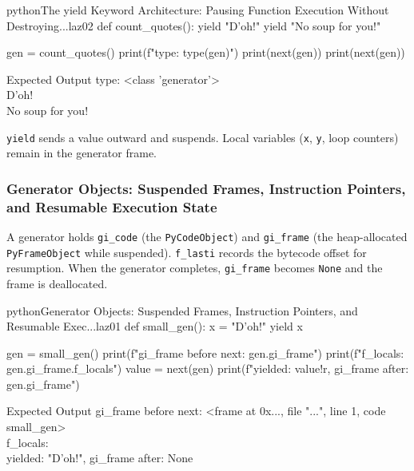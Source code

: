 \documentclass[a4paper,twoside]{report}
\begin{document}
\begin{codebox}[]{python}{The yield Keyword Architecture: Pausing Function Execution Without Destroying...}{laz02}
def count_quotes():
    yield "D'oh!"
    yield "No soup for you!"

gen = count_quotes()
print(f"type: {type(gen)}")
print(next(gen))
print(next(gen))
\end{codebox}


\begin{iobox}{Expected Output}
type: <class 'generator'> \\
D'oh! \\
No soup for you! \\
\end{iobox}




\texttt{yield} sends a value outward and suspends. Local variables (\texttt{x}, \texttt{y}, loop counters) remain in the generator frame.

\subsubsection{Generator Objects: Suspended Frames, Instruction Pointers, and Resumable Execution State}

A generator holds \texttt{gi\_code} (the \texttt{PyCodeObject}) and \texttt{gi\_frame} (the heap-allocated \texttt{PyFrameObject} while suspended). \texttt{f\_lasti} records the bytecode offset for resumption. When the generator completes, \texttt{gi\_frame} becomes \texttt{None} and the frame is deallocated.

\begin{codebox}[]{python}{Generator Objects: Suspended Frames, Instruction Pointers, and Resumable Exec...}{laz01}
def small_gen():
    x = "D'oh!"
    yield x

gen = small_gen()
print(f"gi_frame before next: {gen.gi_frame}")
print(f"f_locals: {gen.gi_frame.f_locals}")
value = next(gen)
print(f"yielded: {value!r}, gi_frame after: {gen.gi_frame}")
\end{codebox}


\begin{iobox}{Expected Output}
gi\_frame before next: <frame at 0x..., file "...", line 1, code small\_gen> \\
f\_locals: {} \\
yielded: "D'oh!", gi\_frame after: None \\
\end{iobox}
\end{document}
